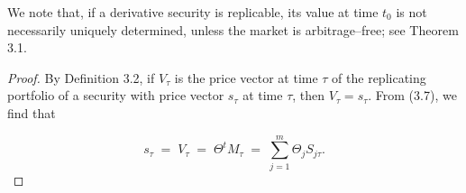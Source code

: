 We note that, if a derivative security is replicable, its value at time
$t_0$ is not necessarily uniquely determined, unless the market is
arbitrage--free; see Theorem 3.1.

\begin{proof}
By Definition 3.2, if $V_\tau$ is the price vector at time $\tau$ of the
replicating portfolio of a security with price vector $s_\tau$ at time
$\tau$, then $V_\tau = s_\tau$. From (3.7), we find that

\[
s_\tau \;=\; V_\tau \;=\; \Theta^t M_\tau \;=\; \sum_{j=1}^m \Theta_j
S_{j\tau}.
\]
\end{proof}
